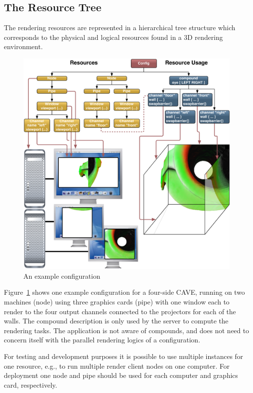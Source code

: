 \documentclass[10pt,a4]{scrartcl}
\newcommand{\fig}[1]{Figure~\ref{#1}}
\begin{document}
\subsection{\label{sResource}The Resource Tree}

The rendering resources are represented in a hierarchical tree structure
which corresponds to the physical and logical resources found in a 3D
rendering environment. 

\begin{figure}[ht!]\center
  \includegraphics[width=.9\textwidth]{images/cave.pdf}
  {\caption{\small\label{fConfig}An example configuration}}
\end{figure}

\fig{fConfig} shows one example configuration for a four-side
CAVE\texttrademark, running on two machines (node) using three graphics
cards (pipe) with one window each to render to the four output channels
connected to the projectors for each of the walls. The compound
description is only used by the server to compute the rendering
tasks. The application is not aware of compounds, and does not need to
concern itself with the parallel rendering logics of a configuration.

For testing and development purposes it is possible to use multiple
instances for one resource, e.g., to run multiple render client nodes on
one computer. For deployment one node and pipe should be used for each
computer and graphics card, respectively.
\end{document}
